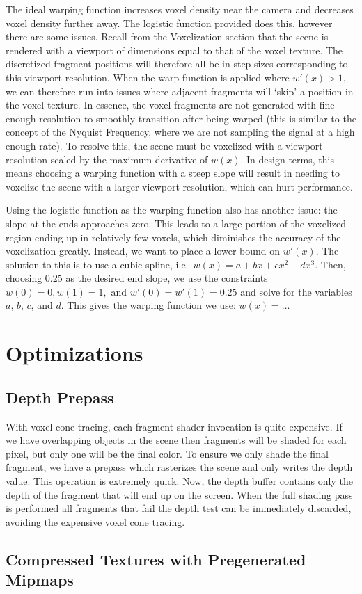 The ideal warping function increases voxel density near the camera and decreases voxel density further away. The logistic function provided does this, however there are some issues. Recall from the Voxelization section that the scene is rendered with a viewport of dimensions equal to that of the voxel texture. The discretized fragment positions will therefore all be in step sizes corresponding to this viewport resolution. When the warp function is applied where $w'(x) > 1$, we can therefore run into issues where adjacent fragments will `skip' a position in the voxel texture. In essence, the voxel fragments are not generated with fine enough resolution to smoothly transition after being warped (this is similar to the concept of the Nyquist Frequency, where we are not sampling the signal at a high enough rate). To resolve this, the scene must be voxelized with a viewport resolution scaled by the maximum derivative of $w(x)$. In design terms, this means choosing a warping function with a steep slope will result in needing to voxelize the scene with a larger viewport resolution, which can hurt performance. %

Using the logistic function as the warping function also has another issue: the slope at the ends approaches zero. This leads to a large portion of the voxelized region ending up in relatively few voxels, which diminishes the accuracy of the voxelization greatly. %
Instead, we want to place a lower bound on $w'(x)$. The solution to this is to use a cubic spline, i.e.\ $w(x) = a + bx + cx^2 + dx^3$. Then, choosing 0.25 as the desired end slope, we use the constraints $w(0) = 0, w(1) = 1, \text{ and } w'(0) = w'(1) = 0.25$ and solve for the variables $a$, $b$, $c$, and $d$. This gives the warping function we use: $w(x) = \ldots$ %


\section{Optimizations}
\subsection{Depth Prepass}
With voxel cone tracing, each fragment shader invocation is quite expensive. If we have overlapping objects in the scene then fragments will be shaded for each pixel, but only one will be the final color. To ensure we only shade the final fragment, we have a prepass which rasterizes the scene and only writes the depth value. This operation is extremely quick. Now, the depth buffer contains only the depth of the fragment that will end up on the screen. When the full shading pass is performed all fragments that fail the depth test can be immediately discarded, avoiding the expensive voxel cone tracing.

\subsection{Compressed Textures with Pregenerated Mipmaps}

